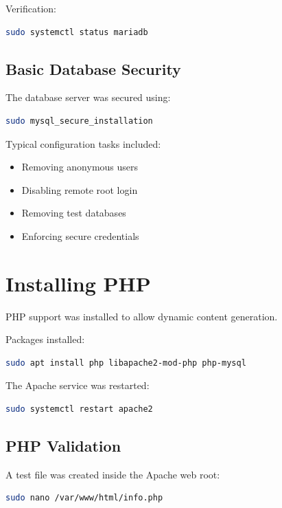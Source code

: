 \documentclass[11pt,a4paper]{article}
\begin{document}
Verification:

\begin{lstlisting}[language=bash]
sudo systemctl status mariadb
\end{lstlisting}

\subsection{Basic Database Security}

The database server was secured using:

\begin{lstlisting}[language=bash]
sudo mysql_secure_installation
\end{lstlisting}

Typical configuration tasks included:
\begin{itemize}
    \item Removing anonymous users
    \item Disabling remote root login
    \item Removing test databases
    \item Enforcing secure credentials
\end{itemize}

\section{Installing PHP}

PHP support was installed to allow dynamic content generation.

Packages installed:

\begin{lstlisting}[language=bash]
sudo apt install php libapache2-mod-php php-mysql
\end{lstlisting}

The Apache service was restarted:

\begin{lstlisting}[language=bash]
sudo systemctl restart apache2
\end{lstlisting}

\subsection{PHP Validation}

A test file was created inside the Apache web root:

\begin{lstlisting}[language=bash]
sudo nano /var/www/html/info.php
\end{lstlisting}
\end{document}
